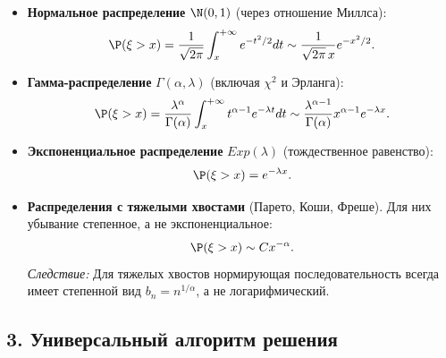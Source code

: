 \begin{itemize}
    \item \textbf{Нормальное распределение} $\N(0,1)$ (через отношение Миллса):
    \[ \P(\xi > x) = \frac{1}{\sqrt{2\pi}} \int_x^{+\infty} e^{-t^2/2} dt \sim \frac{1}{\sqrt{2\pi} \, x} e^{-x^2/2}. \]
    \item \textbf{Гамма-распределение} $\Gamma(\alpha, \lambda)$ (включая $\chi^2$ и Эрланга):
    \[ \P(\xi > x) = \frac{\lambda^\alpha}{\Gamma(\alpha)} \int_x^{+\infty} t^{\alpha-1} e^{-\lambda t} dt \sim \frac{\lambda^{\alpha-1}}{\Gamma(\alpha)} x^{\alpha-1} e^{-\lambda x}. \]
    \item \textbf{Экспоненциальное распределение} $Exp(\lambda)$ (тождественное равенство):
    \[ \P(\xi > x) = e^{-\lambda x}. \]
    \item \textbf{Распределения с тяжелыми хвостами} (Парето, Коши, Фреше). Для них убывание степенное, а не экспоненциальное:
    \[ \P(\xi > x) \sim C x^{-\alpha}. \]
    \textit{Следствие:} Для тяжелых хвостов нормирующая последовательность всегда имеет степенной вид $b_n = n^{1/\alpha}$, а не логарифмический.
\end{itemize}

\subsection*{3. Универсальный алгоритм решения}

